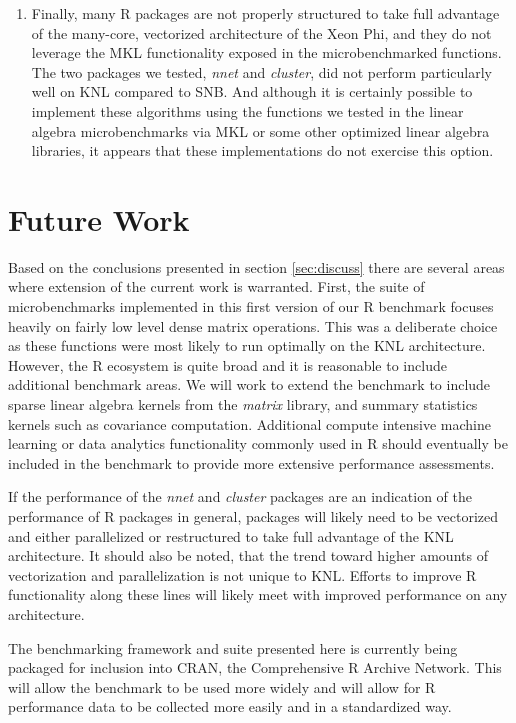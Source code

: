 \begin{enumerate}
\item Finally, many R packages are not properly structured to take full
advantage of the many-core, vectorized architecture of the Xeon Phi, and they do not
leverage the MKL functionality exposed in the microbenchmarked functions. The two
packages we tested, \textit{nnet} and \textit{cluster}, did not perform
particularly well on KNL compared to SNB. And although it is certainly possible to
implement these algorithms using the functions we tested in the linear algebra
microbenchmarks via MKL or some other optimized linear algebra libraries, it appears that
these implementations do not exercise this option.

\end{enumerate}

\section{Future Work} \label{sec:future}
Based on the conclusions presented in section \ref{sec:discuss} there are several areas
where extension of the current work is warranted. First, the suite of microbenchmarks
implemented in this first version of our R benchmark focuses heavily on fairly low level
dense matrix operations. This was a deliberate choice as these functions were most likely
to run optimally on the KNL architecture. However, the R ecosystem is quite broad and it
is reasonable to include additional benchmark areas.
We will work to extend the benchmark to include sparse linear algebra kernels from the
\textit{matrix} library, and summary statistics kernels such as covariance computation.
Additional compute intensive machine learning or data analytics functionality commonly
used in R should eventually be included in the benchmark to provide more extensive
performance assessments.

If the performance of the \textit{nnet} and \textit{cluster}
packages are an indication of the performance of R packages in general, packages will
likely need to be vectorized and either parallelized or restructured to take full
advantage of the KNL architecture. It should also be noted, that the trend toward higher
amounts of vectorization and parallelization is not unique to KNL. Efforts to improve R
functionality along these lines will likely meet with improved performance on any
architecture.

The benchmarking framework and suite presented here is currently being packaged for inclusion into CRAN, the Comprehensive R Archive Network. This will allow the benchmark to be used more widely and will allow for R performance data to be collected more easily and in a standardized way.

